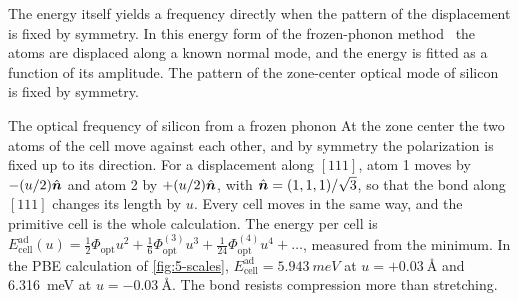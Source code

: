 The energy itself yields a frequency directly when the pattern of the displacement is fixed by symmetry. In this energy form of the frozen-phonon method~\cite[Sect.~IV.B]{baroni2001phonons} the atoms are displaced along a known normal mode, and the energy is fitted as a function of its amplitude. The pattern of the zone-center optical mode of silicon is fixed by symmetry.

\begin{workedexample}{The optical frequency of silicon from a frozen phonon}\label{we:5-frozen}
At the zone center the two atoms of the cell move against each other, and by symmetry the polarization is fixed up to its direction. For a displacement along $[111]$, atom 1 moves by $-(u/2)\hat{\bm{n}}$ and atom 2 by $+(u/2)\hat{\bm{n}}$, with $\hat{\bm{n}} = (1,1,1)/\sqrt3$, so that the bond along $[111]$ changes its length by $u$. Every cell moves in the same way, and the primitive cell is the whole calculation. The energy per cell is $E^{\mathrm{ad}}_{\mathrm{cell}}(u) = \tfrac12\Phi_{\mathrm{opt}}u^2 + \tfrac16\Phi^{(3)}_{\mathrm{opt}}u^3 + \tfrac1{24}\Phi^{(4)}_{\mathrm{opt}}u^4 + \dots$, measured from the minimum. In the PBE calculation of \cref{fig:5-scales}, $E^{\mathrm{ad}}_{\mathrm{cell}} = \SI{5.943}{meV}$ at $u = +\SI{0.03}{\angstrom}$ and \SI{6.316}{meV} at $u = -\SI{0.03}{\angstrom}$. The bond resists compression more than stretching.


\end{workedexample}
